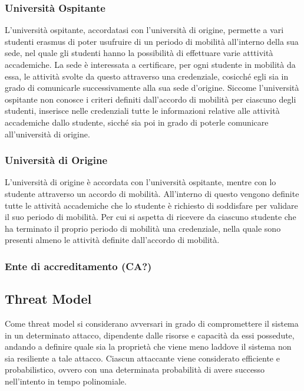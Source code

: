 \documentclass[a4paper,12pt]{article}
\begin{document}
\subsubsection{Università Ospitante}
L'università ospitante, accordatasi con l'università di origine, permette a vari studenti erasmus di poter usufruire di un periodo di mobilità all'interno della sua sede, nel quale gli studenti hanno la possibilità di effettuare varie atttività accademiche.
\newline La sede è interessata a certificare, per ogni studente in mobilità da essa, le attività svolte da questo attraverso una credenziale, cosicché egli sia in grado di comunicarle successivamente alla sua sede d'origine.
\newline Siccome l'università ospitante non conosce i criteri definiti dall'accordo di mobilità per ciascuno degli studenti, inserisce nelle credenziali tutte le informazioni relative alle attività accademiche dallo studente, sicché sia poi in grado di poterle comunicare all'università di origine.


\subsubsection{Università di Origine}
L'università di origine è accordata con l'università ospitante, mentre con lo studente attraverso un accordo di mobilità. All'interno di questo vengono definite tutte le attività accademiche che lo studente è richiesto di soddisfare per validare il suo periodo di mobilità. 
\newline Per cui si aspetta di ricevere da ciascuno studente che ha terminato il proprio periodo di mobilità una credenziale, nella quale sono presenti almeno le attività definite dall'accordo di mobilità.
\subsubsection{Ente di accreditamento (CA?)}

\subsection{Threat Model}
Come threat model si considerano avversari in grado di compromettere il sistema in un determinato attacco, dipendente dalle risorse e capacità da essi possedute, andando a definire quale sia la proprietà che viene meno laddove il sistema non sia resiliente a tale attacco.
\newline Ciascun attaccante viene considerato efficiente e probabilistico, ovvero con una determinata probabilità di avere successo nell'intento in tempo polinomiale.
\end{document}

